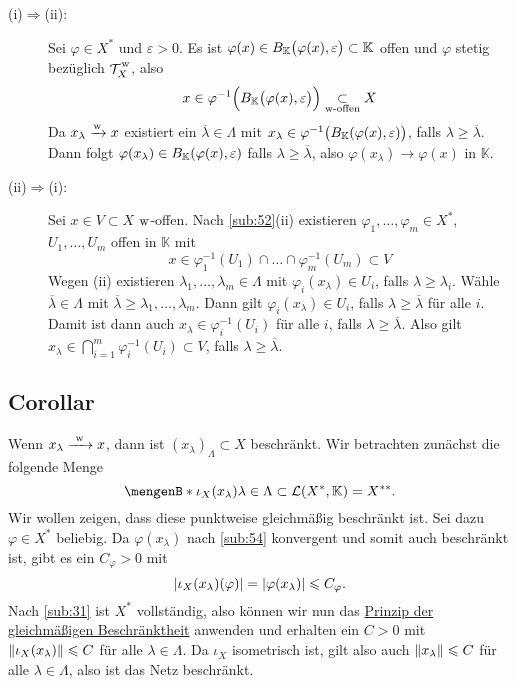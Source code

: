 \begin{description}
	\item[(i)$\Rightarrow$(ii):] Sei $\varphi \in X^*$ und $\varepsilon>0$. Es ist $\varphi(x) \in B_\mathds{K}\enbrace[\big]{\varphi(x),\varepsilon} \subset \mathds{K}$ 
	offen und $\varphi$ stetig bezüglich $\weakT{X}$, also
	\[
		x \in \varphi ^{-1} \enbrace[\Big]{ B_\mathds{K}\enbrace[\big]{\varphi(x), \varepsilon} } \underset{\text{$\w$-offen}}{\subset} X 
	\] 
	Da $x_\lambda \xrightarrow{\w} x$ existiert ein $ \overline{\lambda } \in \Lambda$ mit 
	$x_\lambda \in \varphi^{-1}\enbrace[\big]{B_\mathds{K}\enbrace*{\varphi(x), \varepsilon}}$, falls $\lambda \ge \overline{\lambda }$. Dann folgt
	$\varphi(x_\lambda ) \in B_\mathds{K}\enbrace*{\varphi(x),\varepsilon}$ falls $\lambda \ge \overline{\lambda}$, also $\varphi(x_\lambda ) \to \varphi(x)$ in $\mathds{K}$.
	\item[(ii)$\Rightarrow$(i):] Sei $x \in V \subset X$ $\w$-offen. Nach \ref{sub:52}(ii) existieren $\varphi_1, \ldots , \varphi_m \in X^*$, $U_1, \ldots , U_m$ offen in
	$\mathds{K}$ mit 
	\[
		x \in \varphi_1 ^{-1}(U_1) \cap \ldots  \cap \varphi_m ^{-1}(U_m) \subset V
	\]
	Wegen (ii) existieren $\lambda_1, \ldots , \lambda _m \in \Lambda$ mit $\varphi_i(x_\lambda ) \in U_i$, falls $\lambda  \ge \lambda_i$.
	Wähle $\overline{\lambda} \in \Lambda$ mit $\overline{\lambda} \ge \lambda_1, \ldots , \lambda_m$. Dann gilt $\varphi_i(x_\lambda) \in U_i$, falls 
	$\lambda \ge \overline{\lambda}$ für alle $i$. Damit ist dann auch $x_\lambda \in \varphi_i ^{-1}(U_i)$ für alle $i$, falls $\lambda \ge \overline{\lambda}$. Also gilt
	$x_\lambda \in \bigcap_{i=1}^m \varphi_i ^{-1}(U_i) \subset V$, falls $\lambda \ge \overline{\lambda}$. \bewende
\end{description}

\subsection[Corollar: Schwach konvergente Netze sind beschränkt]{Corollar} %
\label{sub:55}
Wenn $x_\lambda \xrightarrow{\minwidthbox{\w}{1.2em}} x$, dann ist $(x_\lambda)_\Lambda \subset X$ beschränkt.
Wir betrachten zunächst die folgende Menge 
\[
	\set[\iota_X(x_\lambda)]{\lambda\in \Lambda}\subset \mathcal{L}(X^*,\mathds{K})=X^{**}.
\]
Wir wollen zeigen, dass diese punktweise gleichmäßig beschränkt ist. Sei dazu $\varphi\in X^*$ beliebig. Da $\varphi(x_\lambda)$ nach \ref{sub:54} konvergent und somit auch 
beschränkt ist, gibt es ein $C_\varphi>0$ mit
\[
	\abs*{\iota_X(x_\lambda)(\varphi)} = \abs*{\varphi(x_\lambda)} \le C_\varphi.
\]
Nach \ref{sub:31} ist $X^*$ vollständig, also können wir nun das \hyperref[sub:35]{Prinzip der gleichmäßigen Beschränktheit} anwenden und erhalten ein $C>0$ mit 
$\norm{\iota_X(x_\lambda)} \le C$ für alle $\lambda\in \Lambda$. Da $\iota_X$ isometrisch ist, gilt also auch $\norm{x_\lambda} \le C$ für alle $\lambda\in \Lambda$, also 
ist das Netz beschränkt. \bewende

